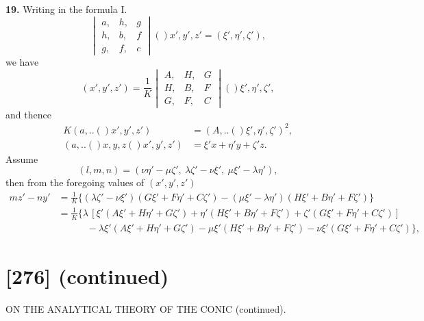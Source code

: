 \documentclass[11pt,a4paper]{book}
\providecommand{\qform}[1]{(#1)}
\begin{document}
\textbf{19.} Writing in the formula I.
\[
\begin{vmatrix}
a, & h, & g \\
h, & b, & f \\
g, & f, & c
\end{vmatrix}
\!\qform{}{x', y', z'} = (\xi', \eta', \zeta'),
\]
we have
\[
(x', y', z') = \frac{1}{K}
\begin{vmatrix}
A, & H, & G \\
H, & B, & F \\
G, & F, & C
\end{vmatrix}
\!\qform{}{\xi', \eta', \zeta'},
\]
and thence
\begin{align*}
K(a,..\!\qform{}{x', y', z'}) &= (A,..\!\qform{}{\xi', \eta', \zeta'})^{2},\\
(a,..\!\qform{}{x, y, z}\!\qform{}{x', y', z'}) &= \xi'x + \eta'y + \zeta'z.
\end{align*}
Assume
\[
(l, m, n) = (\nu\eta' - \mu\zeta',\ \lambda\zeta' - \nu\xi',\ \mu\xi' - \lambda\eta'),
\]
then from the foregoing values of $(x', y', z')$
\begin{align*}
mz' - ny' &= \frac{1}{K}\Big\{ (\lambda\zeta' - \nu\xi')(G\xi' + F\eta' + C\zeta')
- (\mu\xi' - \lambda\eta')(H\xi' + B\eta' + F\zeta') \Big\}\\
&= \frac{1}{K}\Big\{ \lambda\, [\xi'(A\xi' + H\eta' + G\zeta')
+ \eta'(H\xi' + B\eta' + F\zeta')
+ \zeta'(G\xi' + F\eta' + C\zeta')]\\
&\qquad\quad - \lambda\xi'(A\xi' + H\eta' + G\zeta')
- \mu\xi'(H\xi' + B\eta' + F\zeta')
- \nu\xi'(G\xi' + F\eta' + C\zeta') \Big\},
\end{align*}

\newpage
\section*{[276] (continued)}
\begin{center}
{\large ON THE ANALYTICAL THEORY OF THE CONIC (continued).}
\end{center}
\end{document}
